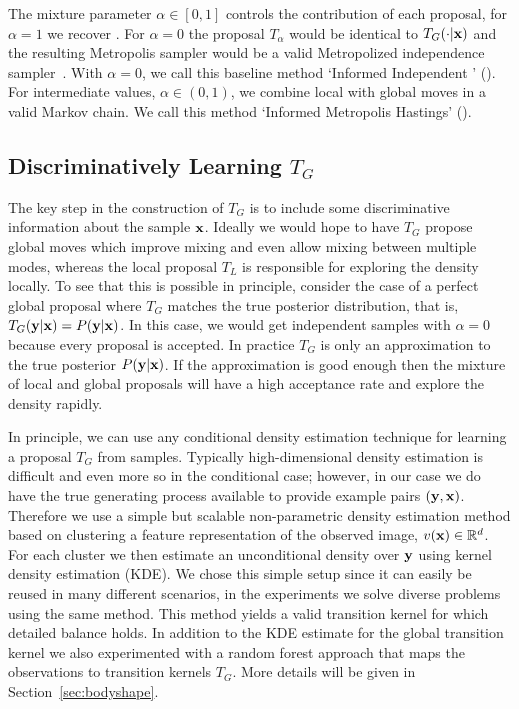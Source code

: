 The mixture parameter $\alpha \in [0,1]$ controls the contribution of each
proposal, for $\alpha=1$ we recover \MH.
%
For $\alpha=0$ the proposal $T_{\alpha}$ would be identical to $T_G(\cdot |
\mathbf{x})$ and the resulting Metropolis sampler would be a valid Metropolized
independence sampler~\cite{liu2001montecarlo}.
With $\alpha=0$, we call this baseline method `Informed Independent \MH' (\INDLMH).
For intermediate values, $\alpha\in(0,1)$, we combine local with global moves
in a valid Markov chain.
We call this method `Informed Metropolis Hastings' (\MIXLMH).

\subsection{Discriminatively Learning $T_G$}
The key step in the construction of $T_G$ is to include some discriminative
information about the sample $\mathbf{x}$.
Ideally we would hope to have $T_G$ propose global moves which improve mixing
and even allow mixing between multiple modes, whereas the local proposal $T_L$ is
responsible for exploring the density locally.
%
To see that this is possible in principle, consider the case of a perfect
global proposal where $T_G$ matches the true posterior distribution, that is,
$T_G(\mathbf{y} | \mathbf{x})=P(\mathbf{y} | \mathbf{x})$.
In this case, we would get independent samples with $\alpha=0$ because every
proposal is accepted.
%
In practice $T_G$ is only an approximation to the true posterior
$P(\mathbf{y}|\mathbf{x})$.
If the approximation is good enough then the mixture of local and global
proposals will have a high acceptance rate and explore the density rapidly.

In principle, we can use any conditional density estimation technique
for learning a proposal $T_G$ from samples.
%
Typically high-dimensional density estimation is difficult and even
more so in the conditional case; however, in our case we do have the
true generating process available to provide example pairs $(\mathbf{y},\mathbf{x})$.
%
Therefore we use a simple but scalable non-parametric density
estimation method based on clustering a feature representation of the
observed image, $v(\mathbf{x}) \in \mathbb{R}^d$. For each cluster we
then estimate an unconditional density over $\mathbf{y}$ using kernel
density estimation (KDE). We chose this simple setup since it can
easily be reused in many different scenarios, in the experiments we
solve diverse problems using the same method. This method yields a
valid transition kernel for which detailed balance holds.
In addition to the KDE estimate for the global transition kernel we
also experimented with a random forest approach that maps the
observations to transition kernels $T_G$. More details will be given
in Section~\ref{sec:bodyshape}.

